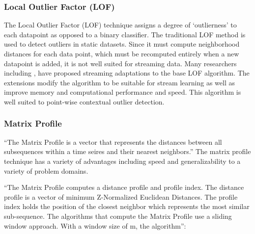 

\subsubsection{Local Outlier Factor (LOF)}

The Local Outlier Factor (LOF) technique assigns a degree of `outlierness' to each datapoint as opposed to a binary classifier. The traditional LOF method is used to detect outliers in static datasets. Since it must compute neighborhood distances for each data point, which must be recomputed entirely when a new datapoint is added, it is not well suited for streaming data. Many researchers including \parencite{dilof-data-streams}, \parencite{fast-memory-efficent-lof-milof} have proposed streaming adaptations to the base LOF algorithm. The extensions modify the algorithm to be suitable for stream learning as well as improve memory and computational performance and speed. This algorithm is well suited to point-wise contextual outlier detection.

\subsubsection{Matrix Profile} %
\label{ref_matrix-profile-alg}
\enquote{The Matrix Profile is a vector that represents the distances between all subsequences within a time seires and their nearest neighbors.} \parencite{yeh2016matrix-profile-1} The matrix profile technique has a variety of advantages including speed and generalizability to a variety of problem domains. 

\enquote{The Matrix Profile computes a distance profile and profile index. The distance profile is a vector of minimum Z-Normalized Euclidean Distances. The profile index holds the position of the closest neighbor which represents the most similar sub-sequence. The algorithms that compute the Matrix Profile use a sliding window approach. With a window size of m, the algorithm}\parencite{matrix-profile-intro}:


